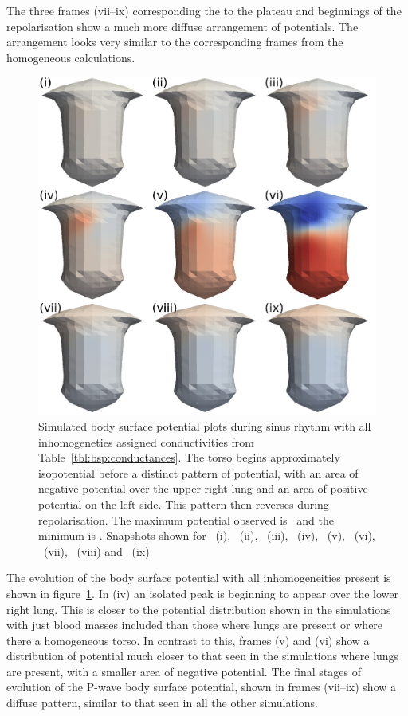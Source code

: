 The three frames (vii--ix) corresponding the to the plateau and beginnings of the
repolarisation show a much more diffuse arrangement of potentials.
The arrangement looks very similar to the corresponding frames from the
homogeneous calculations.


\begin{figure}
\includegraphics{figures/bsp/bsp_all}
\caption[Body Surface Potential snapshots, with all inhomogeneities]{
\label{bsp:fig:all_bsp}
Simulated body surface potential plots during sinus rhythm with all
inhomogeneties assigned conductivities from Table~\ref{tbl:bsp:conductances}.
The torso begins approximately isopotential before a distinct pattern of
potential, with an area of negative potential over the upper right lung and an
area of positive potential on the left side.
This pattern then reverses during repolarisation.
The maximum potential observed is \ and the minimum is .
Snapshots shown for \ (i), \ (ii), \ (iii), \ (iv),
\ (v), \ (vi), \ (vii), \ (viii) and \
(ix)
}
\end{figure}

The evolution of the body surface potential with all inhomogeneities present is
shown in figure~\ref{bsp:fig:all_bsp}.
In (iv) an isolated peak is beginning to appear over the lower
right lung.
This is closer to the potential distribution shown in the simulations with just
blood masses included than those where lungs are present or where there a
homogeneous torso.
In contrast to this, frames (v) and (vi) show a distribution of potential much
closer to that seen in the simulations where lungs are present, with a smaller
area of negative potential.
The final stages of evolution of the P-wave body surface potential, shown in
frames (vii--ix) show a diffuse pattern, similar to that seen in all the other
simulations.

